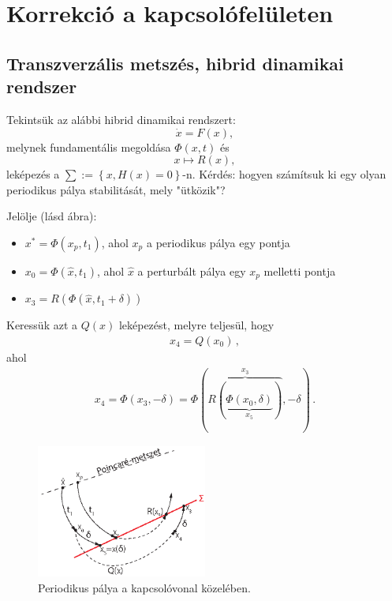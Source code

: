 \chapter{\label{sec:korr_kapcs}Korrekció a kapcsolófelületen}

\section{Transzverzális metszés, hibrid dinamikai rendszer}

Tekintsük az alábbi hibrid dinamikai rendszert:
%
\begin{equation}
\dot{x}=F(x),
\end{equation}
%
\noindent melynek fundamentális megoldása $\Phi (x,t)$ és
%
\begin{equation}
x \mapsto R(x),
\end{equation}
%
\noindent leképezés a $\sum:=\left\{ x, H(x)=0 \right\} $-n. Kérdés: hogyen számítsuk ki egy olyan periodikus pálya stabilitását, mely "ütközik"?

Jelölje (lásd ábra):
\begin{itemize}
\item $x^*=\Phi(x_p,t_1)$, ahol $x_p$ a periodikus pálya egy pontja
\item $x_0=\Phi(\hat{x},t_1)$, ahol $\hat{x}$ a perturbált pálya egy $x_p$ melletti pontja
\item $x_3=R(\Phi(\hat{x},t_1+\delta))$
\end{itemize}
Keressük azt a $Q(x)$ leképezést, melyre teljesül, hogy
\begin{align*}
x_4=Q(x_0)\,,
\end{align*}
ahol 
\begin{align*}
x_4=\Phi(x_3,-\delta)=\Phi(\overbrace{R(\underbrace{\Phi(x_0,\delta)}_{x_5})}^{x_3},-\delta)\,.
\end{align*}
\begin{figure}[ht]
\centering
\includegraphics[width=0.5\textwidth]{graphics/korrKapcs1.png}
\caption{Periodikus pálya a kapcsolóvonal közelében.}
\end{figure}


